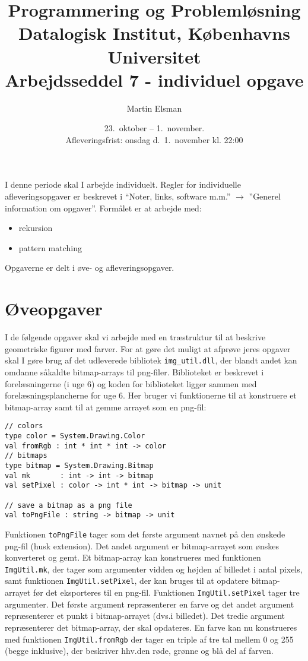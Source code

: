 \documentclass[a4paper,12pt]{article}
\title{Programmering og Problemløsning\\Datalogisk Institut,
  Københavns Universitet\\Arbejdsseddel 7 - individuel opgave}
\author{Martin Elsman}
\date{23.\ oktober -- 1.\ november.\\Afleveringsfrist: onsdag d.\ 1.\ november kl. 22:00}
\begin{document}
\maketitle

\noindent
I denne periode skal I arbejde individuelt. Regler for individuelle afleveringsopgaver er beskrevet i ``Noter, links, software m.m.'' $\rightarrow$ ''Generel information om opgaver''. Formålet er at arbejde med:
\begin{itemize}
\item rekursion
\item pattern matching
\end{itemize}

Opgaverne er delt i øve- og afleveringsopgaver.

\section*{Øveopgaver}
I de følgende opgaver skal vi arbejde med en træstruktur til at beskrive geometriske
figurer med farver.  For at gøre det muligt at afprøve jeres opgaver
skal I gøre brug af det udleverede bibliotek \texttt{img\_util.dll}, der
blandt andet kan omdanne såkaldte bitmap-arrays til png-filer.  Biblioteket er
beskrevet i forelæsningerne (i uge 6) og koden for biblioteket ligger
sammen med forelæsningsplancherne for uge 6.  Her bruger vi
funktionerne til at konstruere et bitmap-array samt til at gemme
arrayet som en png-fil:

\begin{lstlisting}[numbers=none,frame=none,mathescape]
// colors
type color = System.Drawing.Color
val fromRgb : int * int * int -> color
// bitmaps
type bitmap = System.Drawing.Bitmap
val mk       : int -> int -> bitmap
val setPixel : color -> int * int -> bitmap -> unit

// save a bitmap as a png file
val toPngFile : string -> bitmap -> unit
\end{lstlisting}

Funktionen \lstinline{toPngFile} tager som det første argument navnet
på den ønskede png-fil (husk extension).  Det andet argument er
bitmap-arrayet som ønskes konverteret og gemt. Et bitmap-array kan
konstrueres med funktionen \lstinline{ImgUtil.mk}, der tager som
argumenter vidden og højden af billedet i antal pixels, samt funktionen
\lstinline{ImgUtil.setPixel}, der kan bruges til at opdatere bitmap-arrayet
før det eksporteres til en png-fil. Funktionen \lstinline{ImgUtil.setPixel}
tager tre argumenter. Det første argument repræsenterer en farve og
det andet argument repræsenterer et punkt i bitmap-arrayet (dvs.\@ i
billedet). Det tredie argument repræsenterer det bitmap-array, der
skal opdateres.  En farve kan nu konstrueres med funktionen
\lstinline{ImgUtil.fromRgb} der tager en triple af tre tal mellem 0 og
255 (begge inklusive), der beskriver hhv.\@ den røde, grønne og blå del
af farven.
\end{document}
